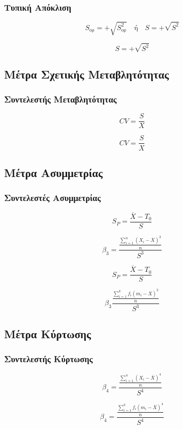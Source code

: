 \subsubsection*{Τυπική Απόκλιση}

\begin{multicols}{2}
  \[
S_{\text{ορ}}=+\sqrt{S_{\text{ορ}}^{2}} \quad\text{ή}\quad S=+\sqrt{S^{2}}
  \]

  \[
S=+\sqrt{S^{2}}
  \]

\end{multicols}

\subsection*{Μέτρα Σχετικής Μεταβλητότητας}


\subsubsection*{Συντελεστής Μεταβλητότητας}

\begin{multicols}{2}

  \[
CV=\frac{S}{X}
  \]

  \[
CV=\frac{S}{X}
  \]

\end{multicols}

\subsection*{Μέτρα Ασυμμετρίας}

\subsubsection*{Συντελεστές Ασυμμετρίας}

\begin{multicols}{2}
  \[
S_{P}=\frac{\overline{X}-T_{0}}{S}
  \]

  \[
  \beta_{3}=\frac{\frac{\sum_{i=1}^{n}(X_{i}-\overline{X})^{3}}{n}}{S^{3}}
  \]

  \columnbreak

  \[
S_{P}=\frac{\overline{X}-T_{0}}{S}
  \]

  \[
\beta_{3}\frac{\frac{\sum_{i=1}^{k}f_{i}(m_{i}-\overline{X})^{3}}{n}}{S^{3}}
  \]

\end{multicols}


\subsection*{Μέτρα Κύρτωσης}

\subsubsection*{Συντελεστής Κύρτωσης}

\begin{multicols}{2}
  \[
  \beta_{4}=\frac{\frac{\sum_{i=1}^{n}(X_{i}-\overline{X})^{4}}{n}}{S^{4}}
  \]

  \[
\beta_{4}=\frac{\frac{\sum_{i=1}^{k}f_{i}(m_{i}-\overline{X})^{4}}{n}}{S^{4}}
  \]
\end{multicols}
